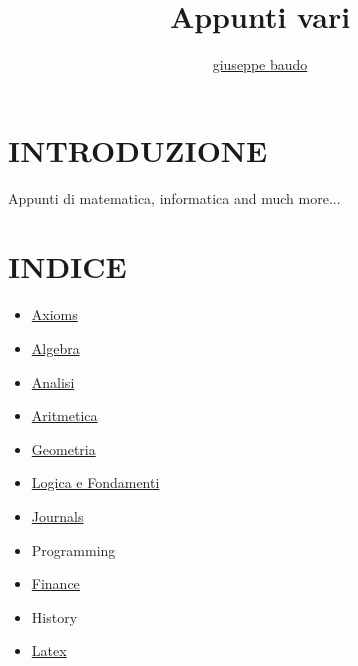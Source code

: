 \documentclass[a4paper,10pt]{article}
\title{Appunti vari}
\author{\href{http://www.baudo.hol.es}{giuseppe baudo}}
\begin{document}
\maketitle

\section{INTRODUZIONE}
Appunti di matematica, informatica and much more...

\section{INDICE}
\begin{itemize}
  \item \href{./Axioms.html}{Axioms}
  \item \href{./AlgebraIndex.html}{Algebra}
  \item \href{./Analisi.html}{Analisi} 
  \item \href{./Aritmetica.html}{Aritmetica}
  \item \href{./Geometria.html}{Geometria} 
  \item \href{./Logics.html}{Logica e Fondamenti}
  \item \href{./Journals.html}{Journals}
  \item Programming
  \item \href{./finance.html}{Finance} 
  \item History 
  \item \href{./latex.html}{Latex} 
  
\end{itemize}
\end{document}

